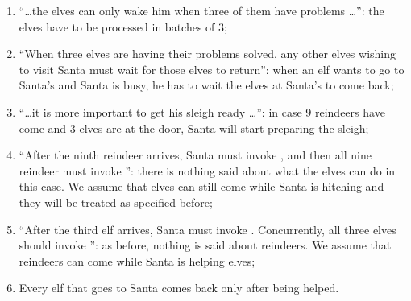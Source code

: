\begin{enumerate}
\item ``\ldots the elves can only wake him when three of them have problems
\ldots'': the elves have to be processed in batches of $3$;

\item ``When three elves are having their problems solved, any other elves
wishing to visit Santa must wait for those elves to return'': when an elf wants
to go to Santa's and Santa is busy, he has to wait the elves at Santa's to come
back;

\item ``\ldots it is more important to get his sleigh ready \ldots'': in case $9$
reindeers have come and $3$ elves are at the door, Santa will start preparing
the sleigh;

\item ``After the ninth reindeer arrives, Santa must invoke , and
then all nine reindeer must invoke '': there is nothing said
about what the elves can do in this case. We assume that elves can still come
while Santa is hitching and they will be treated as specified before;

\item ``After the third elf arrives, Santa must invoke .
Concurrently, all three elves should invoke '': as before,
nothing is said about reindeers. We assume that reindeers can come while Santa
is helping elves;

\item Every elf that goes to Santa comes back only after being helped.
\end{enumerate}
